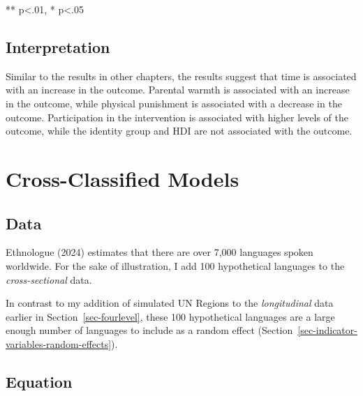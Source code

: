 \documentclass[
  letterpaper,
  DIV=11,
  numbers=noendperiod]{scrreprt}
\begin{document}
** p\textless.01, * p\textless.05

\subsection{Interpretation}\label{interpretation}

Similar to the results in other chapters, the results suggest that time
is associated with an increase in the outcome. Parental warmth is
associated with an increase in the outcome, while physical punishment is
associated with a decrease in the outcome. Participation in the
intervention is associated with higher levels of the outcome, while the
identity group and HDI are not associated with the outcome.

\section{Cross-Classified Models}\label{cross-classified-models}

\subsection{Data}\label{data-1}

Ethnologue (2024) estimates that there are over 7,000 languages spoken
worldwide. For the sake of illustration, I add 100 hypothetical
languages to the \emph{cross-sectional} data.

\begin{tcolorbox}[enhanced jigsaw, coltitle=black, titlerule=0mm, colframe=quarto-callout-tip-color-frame, opacitybacktitle=0.6, toprule=.15mm, colback=white, bottomrule=.15mm, opacityback=0, breakable, title=\textcolor{quarto-callout-tip-color}{\faLightbulb}\hspace{0.5em}{Tip}, bottomtitle=1mm, toptitle=1mm, arc=.35mm, leftrule=.75mm, colbacktitle=quarto-callout-tip-color!10!white, rightrule=.15mm, left=2mm]

In contrast to my addition of simulated UN Regions to the
\emph{longitudinal} data earlier in Section~\ref{sec-fourlevel}, these
100 hypothetical languages are a large enough number of languages to
include as a random effect
(Section~\ref{sec-indicator-variables-random-effects}).

\end{tcolorbox}

\subsection{Equation}\label{equation-1}
\end{document}
